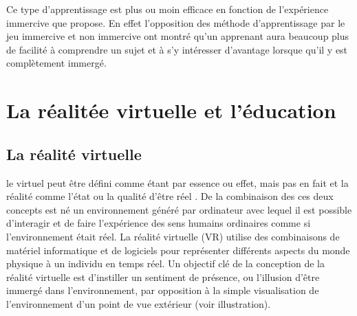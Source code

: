 Ce type d'apprentissage est plus ou moin efficace en fonction de l'expérience immercive que propose. En effet l'opposition des méthode d'apprentissage par le jeu immercive et non 
immercive ont montré qu'un apprenant aura beaucoup plus de facilité à comprendre un sujet et à s'y intéresser d'avantage lorsque qu'il y est complètement immergé\cite{de2017motivational,Shackelford2019RelationshipsBC,Abdelaziz2020TheIO}.

\section{La réalitée virtuelle et l'éducation}
\subsection{La réalité virtuelle}

le virtuel peut être défini comme \og étant par essence ou effet, mais pas en fait \fg\cite{Jerald2015WhatIV} et la réalité comme \og l'état ou la qualité d'être réel \fg\cite{Jerald2015WhatIV}. 
De la combinaison des ces deux concepts est né un environnement généré par ordinateur avec lequel il est possible d'interagir et de faire l'expérience des sens humains ordinaires comme si l'environnement était réel\cite{Rheingold1991VirtualR}. 
La réalité virtuelle (VR) utilise des combinaisons de matériel informatique et de logiciels pour représenter différents aspects du monde physique à un individu en temps réel. 
Un objectif clé de la conception de la réalité virtuelle est d'instiller un sentiment de présence, ou l'illusion d'être immergé dans l'environnement, par opposition à la simple visualisation de l'environnement d'un point de vue extérieur (voir illustration).